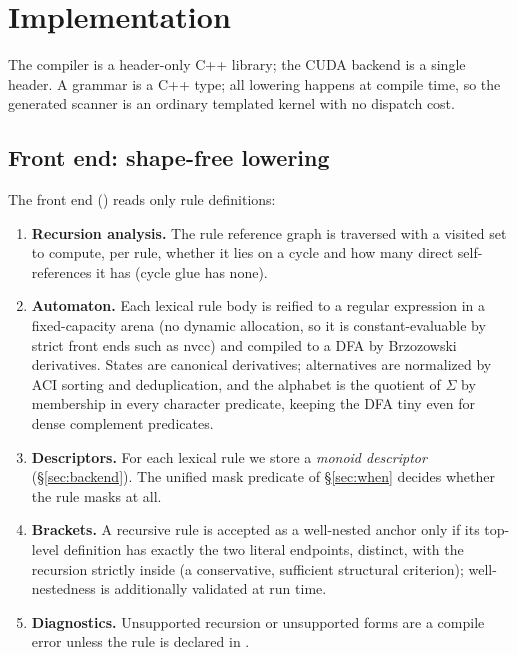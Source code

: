 \section{Implementation}
\label{sec:impl}

The compiler is a header-only C++ library; the CUDA backend is a single header.
A grammar is a C++ type; all lowering happens at compile time, so the generated
scanner is an ordinary templated kernel with no dispatch cost.

\subsection{Front end: shape-free lowering}
\label{sec:frontend}

The front end () reads only rule definitions:
\begin{enumerate}
  \item \textbf{Recursion analysis.} The rule reference graph is traversed with a
    visited set to compute, per rule, whether it lies on a cycle and how many
    direct self-references it has (cycle glue has none).
  \item \textbf{Automaton.} Each lexical rule body is reified to a regular
    expression in a fixed-capacity arena (no dynamic allocation, so it is
    constant-evaluable by strict front ends such as \textsf{nvcc}) and compiled
    to a DFA by Brzozowski derivatives.  States are canonical derivatives;
    alternatives are normalized by ACI sorting and deduplication, and the
    alphabet is the quotient of $\Sigma$ by membership in every character
    predicate, keeping the DFA tiny even for dense complement predicates.
  \item \textbf{Descriptors.} For each lexical rule we store a \emph{monoid
    descriptor} (\S\ref{sec:backend}).  The unified mask predicate of
    \S\ref{sec:when} decides whether the rule masks at all.
  \item \textbf{Brackets.} A recursive rule is accepted as a well-nested anchor
    only if its top-level definition has exactly the two literal endpoints,
    distinct, with the recursion strictly inside (a conservative, sufficient
    structural criterion); well-nestedness is additionally validated at run time.
  \item \textbf{Diagnostics.} Unsupported recursion or unsupported 
    forms are a compile error unless the rule is declared in
    .
\end{enumerate}

